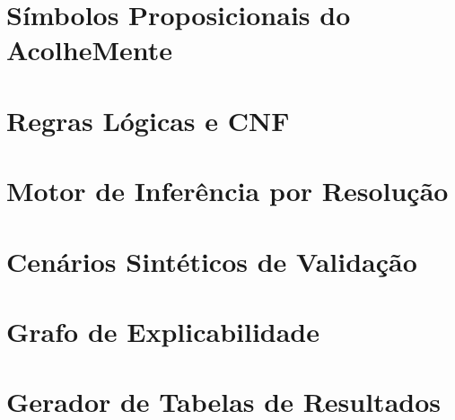 \documentclass[
    12pt,
    openright,
    oneside,
    a4paper,
    english,
    brazil
]{abntex2}
\begin{document}
\begin{apendicesenv}
\partapendices

\chapter{S\'imbolos Proposicionais do AcolheMente}
\label{ap:simbolos}


\chapter{Regras L\'ogicas e CNF}
\label{ap:regras}


\chapter{Motor de Infer\^encia por Resolu\c{c}\~ao}
\label{ap:motor}


\chapter{Cen\'arios Sint\'eticos de Valida\c{c}\~ao}
\label{ap:cenarios}


\chapter{Grafo de Explicabilidade}
\label{ap:grafo}


\chapter{Gerador de Tabelas de Resultados}
\label{ap:tabelas}



\end{apendicesenv}
\end{document}
